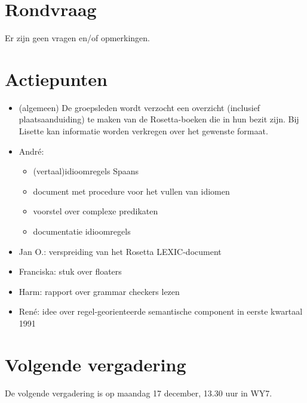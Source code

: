 \section{Rondvraag}
Er zijn geen vragen en/of opmerkingen.

\section{Actiepunten}
\begin{itemize}

  \item (algemeen) 
De groepsleden wordt verzocht een overzicht (inclusief plaatsaanduiding) 
te maken van de Rosetta-boeken die in hun bezit zijn. 
Bij Lisette kan informatie worden verkregen over het gewenste formaat.
  \item Andr\'{e}: 
\begin{itemize}
  \item (vertaal)idioomregels Spaans
  \item document met procedure voor het vullen van idiomen
  \item voorstel over complexe predikaten 
  \item documentatie idioomregels
\end{itemize}
\item Jan O.:
  verspreiding van het Rosetta LEXIC-document

  \item Franciska:  stuk over floaters
  \item Harm: rapport over grammar checkers lezen
  \item Ren\'{e}: idee over regel-georienteerde semantische component in eerste 
kwartaal 1991
\end{itemize}

\section{Volgende vergadering}
De volgende vergadering is op maandag 17 december, 13.30 uur in WY7.\\



